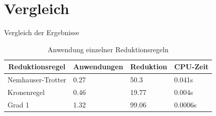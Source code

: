 \documentclass{beamer}
\begin{document}
\section{Vergleich}
\begin{frame}{Vergleich der Ergebnisse}
\begin{table}[htb]
\caption{Anwendung einzelner Reduktionsregeln\label{tab:anwendung}}
\vspace*{1em}
\centering

\bgroup
\def\arraystretch{1.3}%

\begin{tabular}[c]{llll}
	
	\hline
	\multicolumn{1}{c}{\textbf{Reduktionsregel}} & 
	\multicolumn{1}{c}{\textbf{Anwendungen}} & 
	\multicolumn{1}{c}{\textbf{Reduktion}} & 
	\multicolumn{1}{c}{\textbf{CPU-Zeit }} \\ 
	
	\hline

	Nemhauser-Trotter& 0.27 &  50.3 & 0.041s\\
	Kronenregel& 0.46 & 19.77 & 0.004s\\
	Grad 1&1.32 & 99.06 & 0.0006s\\
	\hline
\end{tabular}
\egroup

\end{table}
\end{frame}
\end{document}
